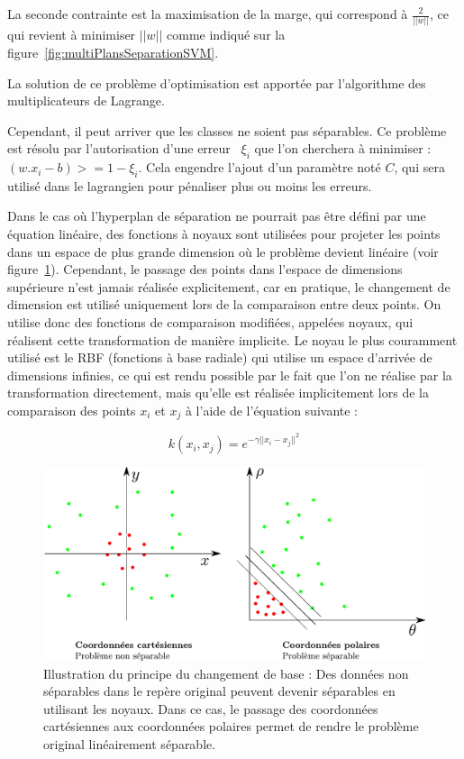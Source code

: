 La seconde contrainte est la maximisation de la marge, qui correspond à  $\frac{2}{||w||}$, ce qui revient à minimiser $||w||$ comme indiqué sur la figure~\ref{fig:multiPlansSeparationSVM}.

La solution de ce problème d'optimisation est apportée par l'algorithme des multiplicateurs de Lagrange. 

Cependant, il peut arriver que les classes ne soient pas séparables. Ce problème est résolu par l'autorisation d'une erreur~\cite{cortes1995support} $\xi_i$  que l'on cherchera à minimiser : $( w . x_i - b ) >= 1 - \xi_i $. Cela engendre l'ajout d'un paramètre noté $C$, qui sera utilisé dans le lagrangien pour pénaliser plus ou moins les erreurs.

Dans le cas où l'hyperplan de séparation ne pourrait pas être défini par une équation linéaire, des fonctions à noyaux sont utilisées pour projeter les points dans un espace de plus grande dimension où le problème devient linéaire (voir figure~\ref{fig:kernelTrick}). Cependant, le passage des points dans l'espace de dimensions supérieure n'est jamais réalisée explicitement, car en pratique, le changement de dimension est utilisé uniquement lors de la comparaison entre deux points. On utilise donc des fonctions de comparaison modifiées, appelées noyaux, qui réalisent cette transformation de manière implicite. Le noyau le plus couramment utilisé est le RBF (fonctions à base radiale) qui utilise un espace d'arrivée de dimensions infinies, ce qui est rendu possible par le fait que l'on ne réalise par la transformation directement, mais qu'elle est réalisée implicitement lors de la comparaison des points $x_i$ et $x_j$ à l'aide de l'équation suivante :

\begin{equation}
k(x_i,x_j)=e^{-\gamma||x_i-x_j||^2}  
\end{equation}

\begin{figure}[h]
	\begin{center}
	\includegraphics[width=15cm]{images/kernelTrick}
	\end{center}
	\caption[Changement de base pour les SVM]{Illustration du principe du changement de base : Des données non séparables dans le repère original peuvent devenir séparables en utilisant les noyaux. Dans ce cas, le passage des coordonnées cartésiennes aux coordonnées polaires permet de rendre le problème original linéairement séparable.}
	\label{fig:kernelTrick}
\end{figure}


